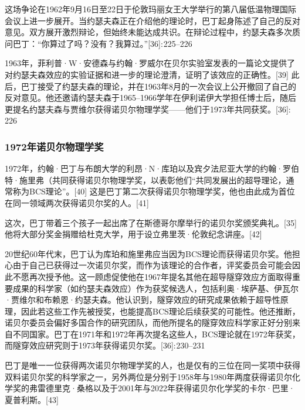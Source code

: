 这场争论在1962年9月16日至22日于伦敦玛丽女王大学举行的第八届低温物理国际会议上进一步展开。当约瑟夫森正在介绍他的理论时，巴丁起身陈述了自己的反对意见。双方展开激烈辩论，但始终未能达成共识。在辩论过程中，约瑟夫森多次质问巴丁：“你算过了吗？没有？我算过。”[36]: 225–226 

1963年，菲利普·W·安德森与约翰·罗威尔在贝尔实验室发表的一篇论文提供了对约瑟夫森效应的实验证据和进一步的理论澄清，证明了该效应的正确性。[39] 此后，巴丁接受了约瑟夫森的理论，并在1963年8月的一次会议上公开撤回了自己的反对意见。他还邀请约瑟夫森于1965–1966学年在伊利诺伊大学担任博士后，随后更提名约瑟夫森与贾维尔获得诺贝尔物理学奖——他们于1973年共同获奖。[36]: 226 
\subsubsection{1972年诺贝尔物理学奖}
1972年，约翰·巴丁与布朗大学的利昂·N·库珀以及宾夕法尼亚大学的约翰·罗伯特·施里弗（共同获得诺贝尔物理学奖，以表彰他们“共同发展出的超导理论，通常称为BCS理论”。[40] 这是巴丁第二次获得诺贝尔物理学奖，他也由此成为首位在同一领域两次获得诺贝尔奖的人。[41]

这次，巴丁带着三个孩子一起出席了在斯德哥尔摩举行的诺贝尔奖颁奖典礼。[35] 他将大部分奖金捐赠给杜克大学，用于设立弗里茨·伦敦纪念讲座。[42]

20世纪60年代末，巴丁认为库珀和施里弗应当因为BCS理论而获得诺贝尔奖。他担心由于自己已获得过一次诺贝尔奖，而作为该理论的合作者，评奖委员会可能会因此不愿再次授予他。这一顾虑促使他在1967年提名其他在超导隧穿效应方面取得重要成果的科学家（如约瑟夫森效应）作为获奖候选人，包括利奥·埃萨基、伊瓦尔·贾维尔和布赖恩·约瑟夫森。他认识到，隧穿效应的研究成果依赖于超导性原理，因此若这些工作先被授奖，也能提高BCS理论后续获奖的可能性。他还推断，诺贝尔委员会偏好多国合作的研究团队，而他所提名的隧穿效应科学家正好分别来自不同国家。巴丁在1971年和1972年再次提名这些人，BCS理论就在1972年获奖，而隧穿效应研究则于1973年获得诺贝尔奖。[36]: 230–231 

巴丁是唯一一位获得两次诺贝尔物理学奖的人，也是仅有的三位在同一奖项中获得双料诺贝尔奖的科学家之一，另外两位是分别于1958年与1980年两度获得诺贝尔化学奖的弗雷德里克·桑格以及于2001年与2022年获得诺贝尔化学奖的卡尔·巴里·夏普利斯。[43]
